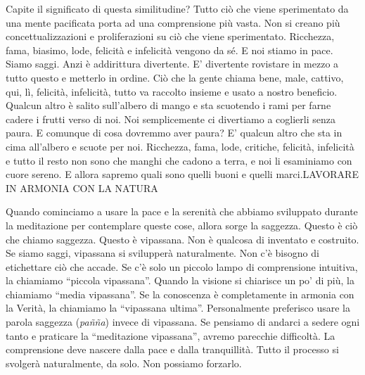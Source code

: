 Capite il significato di questa similitudine? Tutto ciò che viene
sperimentato da una mente pacificata porta ad una comprensione più
vasta. Non si creano più concettualizzazioni e proliferazioni su ciò che
viene sperimentato. Ricchezza, fama, biasimo, lode, felicità e
infelicità vengono da sé. E noi stiamo in pace. Siamo saggi. Anzi è
addirittura divertente. E' divertente rovistare in mezzo a tutto questo
e metterlo in ordine. Ciò che la gente chiama bene, male, cattivo, qui,
lì, felicità, infelicità, tutto va raccolto insieme e usato a nostro
beneficio. Qualcun altro è salito sull'albero di mango e sta scuotendo i
rami per farne cadere i frutti verso di noi. Noi semplicemente ci
divertiamo a coglierli senza paura. E comunque di cosa dovremmo aver
paura? E' qualcun altro che sta in cima all'albero e scuote per noi.
Ricchezza, fama, lode, critiche, felicità, infelicità e tutto il resto
non sono che manghi che cadono a terra, e noi li esaminiamo con cuore
sereno. E allora sapremo quali sono quelli buoni e quelli marci.LAVORARE
IN ARMONIA CON LA NATURA

Quando cominciamo a usare la pace e la serenità che abbiamo sviluppato
durante la meditazione per contemplare queste cose, allora sorge la
saggezza. Questo è ciò che chiamo saggezza. Questo è vipassana. Non è
qualcosa di inventato e costruito. Se siamo saggi, vipassana si
svilupperà naturalmente. Non c'è bisogno di etichettare ciò che accade.
Se c'è solo un piccolo lampo di comprensione intuitiva, la chiamiamo
``piccola vipassana''. Quando la visione si chiarisce un po' di più, la
chiamiamo ``media vipassana''. Se la conoscenza è completamente in
armonia con la Verità, la chiamiamo la ``vipassana ultima''.
Personalmente preferisco usare la parola saggezza (\emph{pañña}) invece
di vipassana. Se pensiamo di andarci a sedere ogni tanto e praticare la
``meditazione vipassana'', avremo parecchie difficoltà. La comprensione
deve nascere dalla pace e dalla tranquillità. Tutto il processo si
svolgerà naturalmente, da solo. Non possiamo forzarlo.


